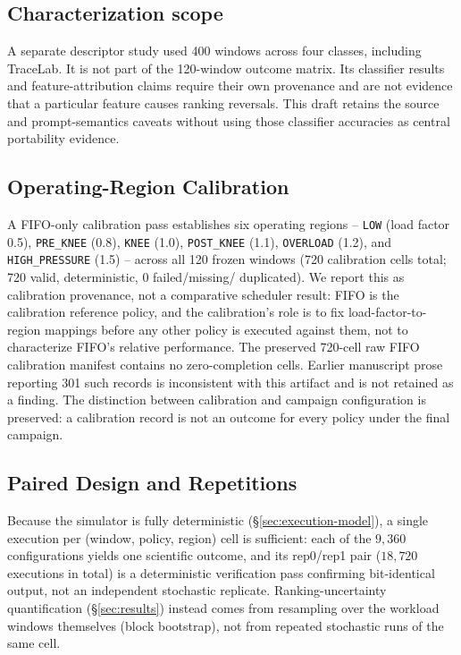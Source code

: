 \subsection{Characterization scope}\label{sec:cross-source-diffs}\label{sec:separability}\label{sec:drivers}
A separate descriptor study used 400 windows across four classes, including
TraceLab. It is not part of the 120-window outcome matrix. Its classifier
results and feature-attribution claims require their own provenance and
are not evidence that a particular feature causes ranking reversals. This
draft retains the source and prompt-semantics caveats without using those
classifier accuracies as central portability evidence.
\subsection{Operating-Region Calibration}
\label{sec:calibration}

A FIFO-only calibration pass establishes six operating regions --
\texttt{LOW} (load factor 0.5), \texttt{PRE\_KNEE} (0.8), \texttt{KNEE}
(1.0), \texttt{POST\_KNEE} (1.1), \texttt{OVERLOAD} (1.2), and
\texttt{HIGH\_PRESSURE} (1.5) -- across all 120 frozen windows (720
calibration cells total; 720 valid, deterministic, 0 failed/missing/
duplicated). We report this as calibration provenance, not a comparative
scheduler result: FIFO is the calibration reference policy, and the
calibration's role is to fix load-factor-to-region mappings before any
other policy is executed against them, not to characterize FIFO's relative
performance. The preserved 720-cell raw FIFO calibration manifest contains no zero-completion cells. Earlier manuscript prose reporting 301 such records is inconsistent with this artifact and is not retained as a finding. The distinction between calibration and campaign configuration is preserved: a calibration record is not an outcome for every policy under the final campaign.

\subsection{Paired Design and Repetitions}
\label{sec:paired}

Because the simulator is fully deterministic (\S\ref{sec:execution-model}),
a single execution per (window, policy, region) cell is sufficient: each of
the $9{,}360$ configurations yields one scientific outcome, and its rep0/rep1
pair ($18{,}720$ executions in total) is a deterministic verification pass
confirming bit-identical output, not an independent stochastic replicate.
Ranking-uncertainty quantification (\S\ref{sec:results}) instead comes from
resampling over the workload windows themselves (block
bootstrap), not from repeated stochastic runs of the same cell.


